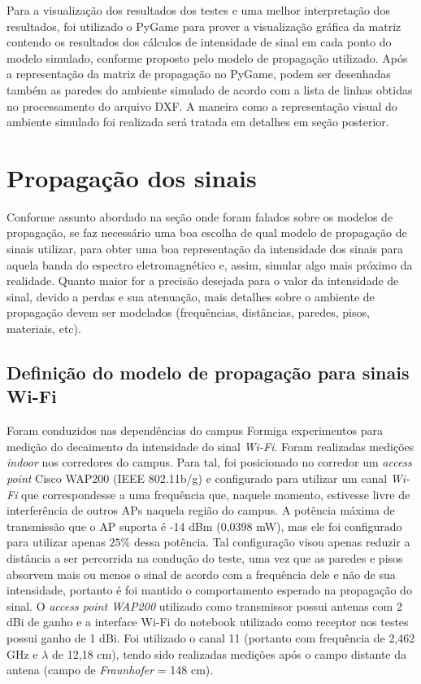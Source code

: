 \documentclass[
	12pt,				%
	openright,			%
	twoside,			%
	a4paper,			%
	english,			%
	french,				%
	spanish,			%
	brazil				%
	]{abntex2}
\begin{document}

Para a visualização dos resultados dos testes e uma melhor interpretação dos resultados, foi utilizado o PyGame para prover a visualização gráfica da matriz contendo os resultados dos cálculos de intensidade de sinal em cada ponto do modelo simulado, conforme proposto pelo modelo de propagação utilizado. Após a representação da matriz de propagação no PyGame, podem ser desenhadas também as paredes do ambiente simulado de acordo com a lista de linhas obtidas no processamento do arquivo DXF. A maneira como a representação visual do ambiente simulado foi realizada será tratada em detalhes em seção posterior. 

\section[Propagação dos sinais]{Propagação dos sinais}

Conforme assunto abordado na seção onde foram falados sobre os modelos de propagação, se faz necessário uma boa escolha de qual modelo de propagação de sinais utilizar, para obter uma boa representação da intensidade dos sinais para aquela banda do espectro eletromagnético e, assim, simular algo mais próximo da realidade. Quanto maior for a precisão desejada para o valor da intensidade de sinal, devido a perdas e sua atenuação, mais detalhes sobre o ambiente de propagação devem ser modelados (frequências, distâncias, paredes, pisos, materiais, etc).

\subsection[Definição do modelo de propagação para sinais Wi-Fi]{Definição do modelo de propagação para sinais Wi-Fi}

Foram conduzidos nas dependências do campus Formiga experimentos para medição do decaimento da intensidade do sinal \textit{Wi-Fi}. Foram realizadas medições \textit{indoor} nos corredores do campus. Para tal, foi posicionado no corredor um \textit{access point} Cisco WAP200 (IEEE 802.11b/g) e configurado para utilizar um canal \textit{Wi-Fi} que correspondesse a uma frequência que, naquele momento, estivesse livre de interferência de outros APs naquela região do campus. A potência máxima de transmissão que o AP suporta é -14 dBm (0,0398 mW), mas ele foi configurado para utilizar apenas $25\%$ dessa potência. Tal configuração visou apenas reduzir a distância a ser percorrida na condução do teste, uma vez que as paredes e pisos absorvem mais ou menos o sinal de acordo com a frequência dele e não de sua intensidade, portanto é foi mantido o comportamento esperado na propagação do sinal. O \textit{access point WAP200} utilizado como transmissor possui antenas com 2 dBi de ganho e a interface Wi-Fi do notebook utilizado como receptor nos testes possui ganho de 1 dBi. Foi utilizado o canal 11 (portanto com frequência de 2,462 GHz e $ \lambda $ de 12,18 cm), tendo sido realizadas medições após o campo distante da antena (campo de \textit{Fraunhofer} = 148 cm).
\end{document}

